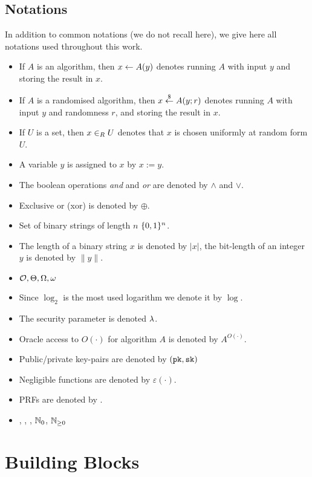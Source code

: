 \subsection{Notations}
In addition to common notations (we do not recall here), we give here all notations used throughout this work.
\begin{itemize}
	\item If $A$ is an algorithm, then $x\gets A(y)$ denotes running $A$ with input $y$ and storing the result in $x$.
	\item If $A$ is a randomised algorithm, then $x\stackrel{\$}{\gets} A(y;r)$ denotes running $A$ with input $y$ and randomness $r$, and storing the result in $x$.
	\item If $U$ is a set, then $x\in_R U$ denotes that $x$ is chosen uniformly at random form $U$.
	\item A variable $y$ is assigned to $x$ by $x:=y$.
	\item The boolean operations \emph{and} and \emph{or} are denoted by $\wedge$ and $\vee$.
	\item Exclusive or (xor) is denoted by $\oplus$.
	\item Set of binary strings of length $n$ $\{0,1\}^n$.
	\item The length of a binary string $x$ is denoted by $|x|$, the bit-length of an integer $y$ is denoted by $\|y\|$.
	\item $\mathcal{O},\Theta,\Omega,\omega$
	\item Since $\log_2$ is the most used logarithm we denote it by $\log$.
	\item The security parameter is denoted $\lambda$.
	\item Oracle access to $O(\cdot)$ for algorithm $A$ is denoted by $A^{O(\cdot)}$.
	\item Public/private key-pairs are denoted by $(\mathtt{pk},\mathtt{sk})$
	\item Negligible functions are denoted by $\varepsilon(\cdot)$.
	\item \aclp{PRF} are denoted by \PRF.
	\item \ZZ, \NN, \RR, $\mathbb{N}_0$, $\mathbb{N}_{\geq 0}$
\end{itemize}


\section{Building Blocks}
